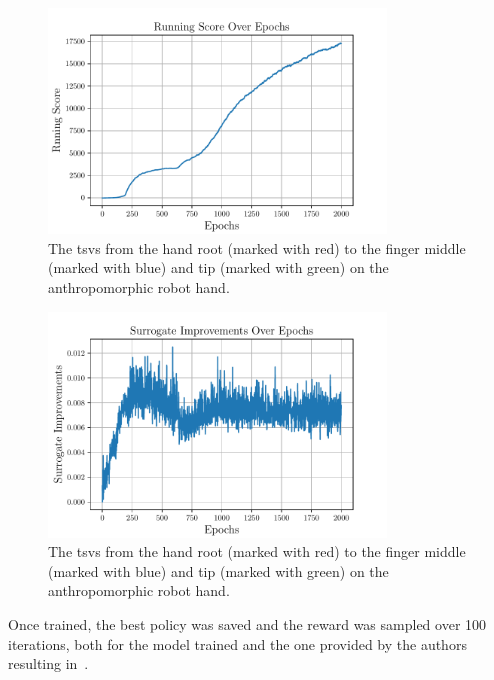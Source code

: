 \begin{figure}[!h]
	\begin{center}
		\includegraphics[width=0.8\textwidth]{chapters/3-in-hand-manipulation/fig/running-score-over-epochs.pdf}
	\end{center}
	\caption{The \gls{tsv}s from the hand root (marked with red) to the finger middle (marked with blue) and tip (marked with green) on the anthropomorphic robot hand.}
	\label{fig:running-score-over-epochs}
\end{figure}

\begin{figure}[!h]
	\begin{center}
		\includegraphics[width=0.8\textwidth]{chapters/3-in-hand-manipulation/fig/surrogate-improvements-over-epochs.pdf}
	\end{center}
	\caption{The \gls{tsv}s from the hand root (marked with red) to the finger middle (marked with blue) and tip (marked with green) on the anthropomorphic robot hand.}
	\label{fig:surrogate-improvements-over-epochs}
\end{figure}

Once trained, the best policy was saved and the reward was sampled over \num{100} iterations, both for the model trained and the one provided by the authors resulting in~. 

